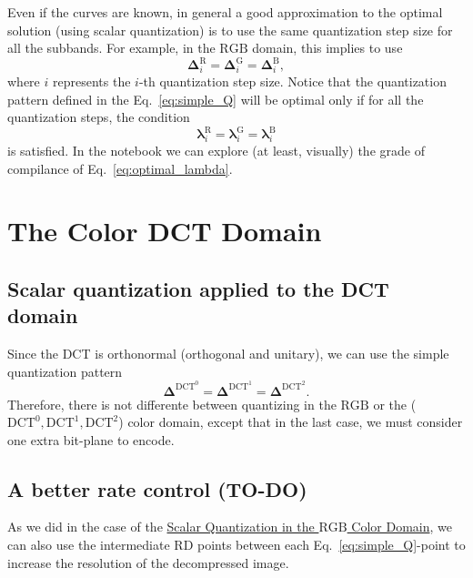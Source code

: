 Even if the curves are known, in general a good approximation to the
optimal solution (using scalar quantization) is to use the same
quantization step size for all the subbands. For example, in the
$\text{RGB}$ domain, this implies to use
\begin{equation}
  \mathbf{\Delta}^{\text{R}}_i = \mathbf{\Delta}^{\text{G}}_i =
  \mathbf{\Delta}^{\text{B}}_i,
  \label{eq:simple_Q}
\end{equation}
where $i$ represents the $i$-th quantization step size. Notice that
the quantization pattern defined in the Eq.~\eqref{eq:simple_Q} will
be optimal only if for all the quantization steps, the condition
\begin{equation}
  \mathbf{\lambda}^{\text{R}}_i = \mathbf{\lambda}^{\text{G}}_i =
  \mathbf{\lambda}^{\text{B}}_i
  \label{eq:optimal_lambda}
\end{equation}
is satisfied. In the notebook \href{https://github.com/Sistemas-Multimedia/Sistemas-Multimedia.github.io/blob/master/contents/RGB_SQ/RGB_SQ.ipynb}{} we can explore (at least, visually) the grade of compilance of
Eq.~\eqref{eq:optimal_lambda}.



\section{The Color DCT Domain}

\subsection{Scalar quantization applied to the DCT domain}
Since the DCT is orthonormal (orthogonal and unitary), we can use the
simple quantization pattern
\begin{equation}
  \mathbf{\Delta}^{\text{DCT}^0} = \mathbf{\Delta}^{\text{DCT}^1} = \mathbf{\Delta}^{\text{DCT}^2}.
  \label{eq:simple_Q}
\end{equation}
Therefore, there is not differente between quantizing in the
$\text{RGB}$ or the ($\text{DCT}^0,\text{DCT}^1,\text{DCT}^2$) color
domain, except that in the last case, we must consider one extra
bit-plane to encode.

\subsection{A better rate control (TO-DO)}
\label{sec:increasing}
As we did in the case of the
\href{https://sistemas-multimedia.github.io/contents/RGB_SQ/}{Scalar
  Quantization in the $\text{RGB}$ Color Domain}, we can also use the
intermediate RD points between each Eq.~\eqref{eq:simple_Q}-point to
increase the resolution of the decompressed image.


